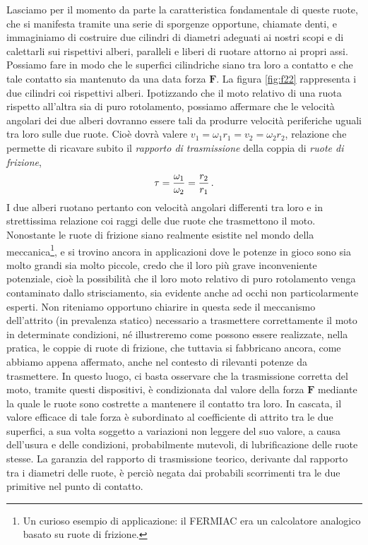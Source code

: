 \noindent Lasciamo per il momento da parte la caratteristica fondamentale di queste
ruote, che si manifesta tramite una serie di sporgenze opportune, chiamate denti, e 
immaginiamo di costruire due cilindri di diametri adeguati ai nostri
scopi e di calettarli sui
rispettivi alberi, paralleli e liberi di ruotare attorno ai propri assi.
Possiamo fare in modo che le superfici cilindriche siano tra loro
a contatto e che tale contatto sia mantenuto da una data forza $\bm F$.
La figura \ref{fig:f22} rappresenta i due cilindri coi rispettivi alberi.
Ipotizzando che il moto relativo di una ruota rispetto all'altra sia di puro
rotolamento, possiamo affermare che le velocit\`a angolari dei due alberi
dovranno essere tali da produrre velocit\`a periferiche uguali
tra loro sulle due ruote.
Cio\`e dovr\`a valere $v_1=\omega_1 r_1 = v_2 = \omega_2 r_2$, 
relazione che permette di ricavare subito il {\em rapporto di trasmissione} della coppia di 
{\em ruote di frizione},
\begin{equation}
\tau={\omega_1\over{\omega_2}}=
{{r_2}\over{r_1}}\,.
\label{eq:tau}
\end{equation}
\noindent I due alberi ruotano pertanto con velocit\`a angolari differenti tra
loro e in strettissima relazione coi raggi delle due ruote che trasmettono
il moto. Nonostante le ruote di frizione siano realmente esistite nel
mondo della meccanica\footnote
{
Un curioso esempio di applicazione: il FERMIAC era un calcolatore analogico basato su ruote di frizione.
}, e si trovino ancora in applicazioni dove le
potenze in gioco sono sia molto grandi sia molto piccole, credo che il
loro pi\`u grave inconveniente potenziale, cio\`e
la possibilit\`a che il loro moto relativo di puro rotolamento venga
contaminato dallo strisciamento, sia evidente anche ad occhi non
particolarmente esperti. Non riteniamo opportuno chiarire
in questa sede il  meccanismo dell'attrito (in prevalenza statico)
necessario a trasmettere correttamente il moto in determinate condizioni,
n\'e illustreremo come possono essere realizzate, nella pratica, le coppie
di ruote di frizione, che tuttavia si fabbricano ancora, come
abbiamo appena affermato, anche
nel contesto di rilevanti potenze da trasmettere.
In questo luogo, ci basta osservare che
la trasmissione corretta del moto, tramite questi dispositivi,
\`e condizionata dal valore della forza $\bm F$ mediante la quale
le ruote sono costrette a mantenere il contatto tra loro.
In cascata, il valore efficace di tale forza \`e subordinato
al coefficiente di attrito tra le due superfici, a sua volta soggetto
a variazioni non leggere del suo valore,
a causa dell'usura e delle condizioni, probabilmente mutevoli, di
lubrificazione delle ruote stesse.
La garanzia del rapporto di trasmissione teorico, derivante dal rapporto tra i
diametri delle ruote, \`e perci\`o negata dai probabili scorrimenti
tra le due primitive nel punto di contatto.


